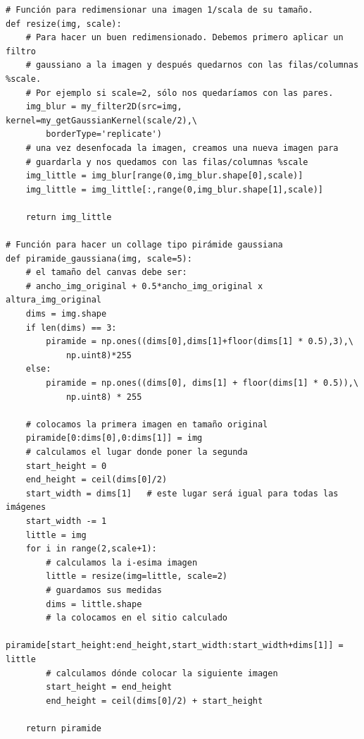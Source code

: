 \documentclass[11pt,a4paper]{article}
\theoremstyle{plain}
\theoremstyle{definition}
\begin{document}
\begin{verbatim}
# Función para redimensionar una imagen 1/scala de su tamaño.
def resize(img, scale):
    # Para hacer un buen redimensionado. Debemos primero aplicar un filtro 
    # gaussiano a la imagen y después quedarnos con las filas/columnas %scale. 
    # Por ejemplo si scale=2, sólo nos quedaríamos con las pares.
    img_blur = my_filter2D(src=img, kernel=my_getGaussianKernel(scale/2),\
        borderType='replicate')
    # una vez desenfocada la imagen, creamos una nueva imagen para 
    # guardarla y nos quedamos con las filas/columnas %scale
    img_little = img_blur[range(0,img_blur.shape[0],scale)]
    img_little = img_little[:,range(0,img_blur.shape[1],scale)]

    return img_little

# Función para hacer un collage tipo pirámide gaussiana
def piramide_gaussiana(img, scale=5):
    # el tamaño del canvas debe ser: 
    # ancho_img_original + 0.5*ancho_img_original x altura_img_original
    dims = img.shape
    if len(dims) == 3:
        piramide = np.ones((dims[0],dims[1]+floor(dims[1] * 0.5),3),\
            np.uint8)*255
    else:
        piramide = np.ones((dims[0], dims[1] + floor(dims[1] * 0.5)),\
            np.uint8) * 255

    # colocamos la primera imagen en tamaño original
    piramide[0:dims[0],0:dims[1]] = img
    # calculamos el lugar donde poner la segunda
    start_height = 0
    end_height = ceil(dims[0]/2)
    start_width = dims[1]   # este lugar será igual para todas las imágenes
    start_width -= 1
    little = img
    for i in range(2,scale+1):
        # calculamos la i-esima imagen
        little = resize(img=little, scale=2)
        # guardamos sus medidas
        dims = little.shape
        # la colocamos en el sitio calculado
        piramide[start_height:end_height,start_width:start_width+dims[1]] = little
        # calculamos dónde colocar la siguiente imagen
        start_height = end_height
        end_height = ceil(dims[0]/2) + start_height

    return piramide
\end{verbatim}
\end{document}
